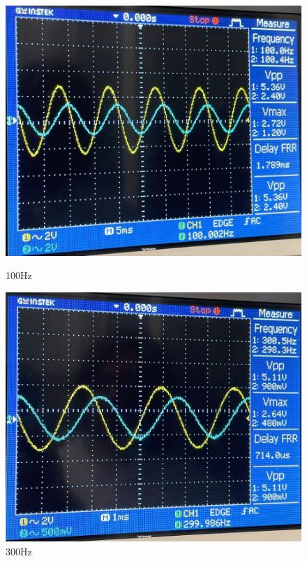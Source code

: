 \begin{figure}[h]
\begin{minipage}{.33\textwidth}
        \includegraphics[width=1\linewidth]{assets/exp2_100.jpeg}
        \caption{100Hz}
        \label{fig:exp2_100}
    \end{minipage}
    \begin{minipage}{.33\textwidth}
        \includegraphics[width=1\linewidth]{assets/exp2_300.jpeg}
        \caption{300Hz}
        \label{fig:exp2_300}
    \end{minipage}%
    \begin{minipage}{.33\textwidth}

\end{minipage}
\end{figure}
